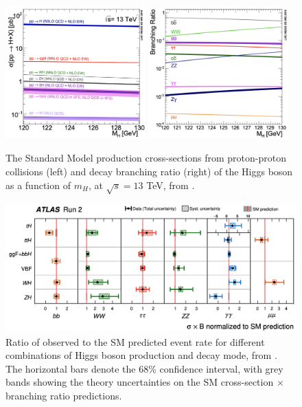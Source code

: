 \begin{figure}[h!]
    \center
    \includegraphics[width=0.48\textwidth]{Images/Theory/prodHiggs.png}
    \includegraphics[width=0.48\textwidth]{Images/Theory/decayHiggs.png}
    \caption{The Standard Model production cross-sections from proton-proton collisions (left) and decay branching ratio (right) of the Higgs boson as a function of $m_H$, at $\sqrt{s} = 13$ TeV, from \cite{LHCHiggsCrossSectionWorkingGroup:2016ypw}.}
    \label{fig:prodH}
\end{figure}
\begin{figure}[h!]
    \hspace{-0.48cm}
    \includegraphics[width=\textwidth]{Images/Theory/allMesRun2.png}
    \caption{Ratio of observed to the SM predicted event rate for different combinations of Higgs boson production and decay mode, from \cite{ATLAS:2022vkf}. The horizontal bars denote the 68\% confidence interval, with grey bands showing the theory uncertainties on the SM cross-section $\times$ branching ratio predictions.}
    \label{fig:measprodH}
\end{figure}


